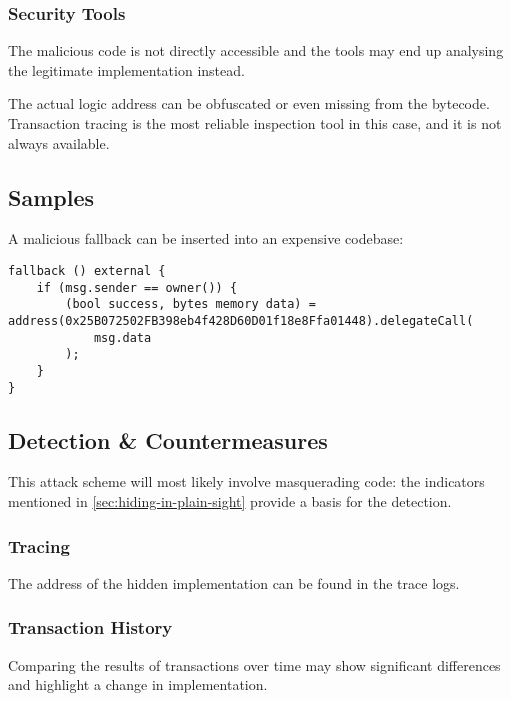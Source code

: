\subsubsection{Security Tools}

The malicious code is not directly accessible and the tools may end up analysing the legitimate implementation instead.

The actual logic address can be obfuscated or even missing from the bytecode.
Transaction tracing is the most reliable inspection tool in this case, and it is not always available.

\subsection{Samples}

A malicious fallback can be inserted into an expensive codebase:

\begin{lstlisting}[language=Solidity]
fallback () external {
    if (msg.sender == owner()) {
        (bool success, bytes memory data) = address(0x25B072502FB398eb4f428D60D01f18e8Ffa01448).delegateCall(
            msg.data
        );
    }
}
\end{lstlisting}

\subsection{Detection \& Countermeasures}

This attack scheme will most likely involve masquerading code: the indicators mentioned in \ref{sec:hiding-in-plain-sight} provide a basis for the detection.

\hspace*{-1.5cm}


\subsubsection{Tracing}

The address of the hidden implementation can be found in the trace logs.

\subsubsection{Transaction History}

Comparing the results of transactions over time may show significant differences and highlight a change in implementation.
